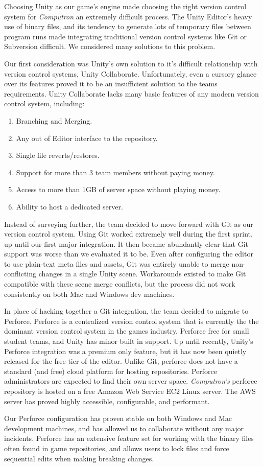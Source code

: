Choosing Unity as our game's engine made choosing the right version control system for \textit{Computron} an extremely difficult process. The Unity Editor's heavy use of binary files, and its tendency to generate lots of temporary files between program runs made integrating traditional version control systems like Git or Subversion difficult. We considered many solutions to this problem.

Our first consideration was Unity's own solution to it's difficult relationship with version control systems, Unity Collaborate. Unfortunately, even a cursory glance over its features proved it to be an insufficient solution to the teams requirements. Unity Collaborate lacks many basic features of any modern version control system, including: 

\begin{enumerate}
    \item Branching and Merging.
    \item Any out of Editor interface to the repository.
    \item Single file reverts/restores.
    \item Support for more than 3 team members without paying money.
    \item Access to more than 1GB of server space without playing money.
    \item Ability to host a dedicated server.
\end{enumerate}

Instead of surveying further, the team decided to move forward with Git as our version control system. Using Git worked extremely well during the first sprint, up until our first major integration. It then became abundantly clear that Git support was worse than we evaluated it to be. Even after configuring the editor to use plain-text meta files and assets, Git was entirely unable to merge non-conflicting changes in a single Unity scene. Workarounds existed to make Git compatible with these scene merge conflicts, but the process did not work consistently on both Mac and Windows dev machines.

In place of hacking together a Git integration, the team decided to migrate to Perforce. Perforce is a centralized version control system that is currently the the dominant version control system in the games industry. Perforce free for small student teams, and Unity has minor built in support. Up until recently, Unity's Perforce integration was a premium only feature, but it has now been quietly released for the free tier of the editor. Unlike Git, perforce does not have a standard (and free) cloud platform for hosting repositories. Perforce administrators are expected to find their own server space. \textit{Computron's} perforce repository is hosted on a free Amazon Web Service EC2 Linux server. The AWS server has proved highly accessible, configurable, and performant. 

Our Perforce configuration has proven stable on both Windows and Mac development machines, and has allowed us to collaborate without any major incidents. Perforce has an extensive feature set for working with the binary files often found in game repositories, and allows users to lock files and force sequential edits when making breaking changes.
